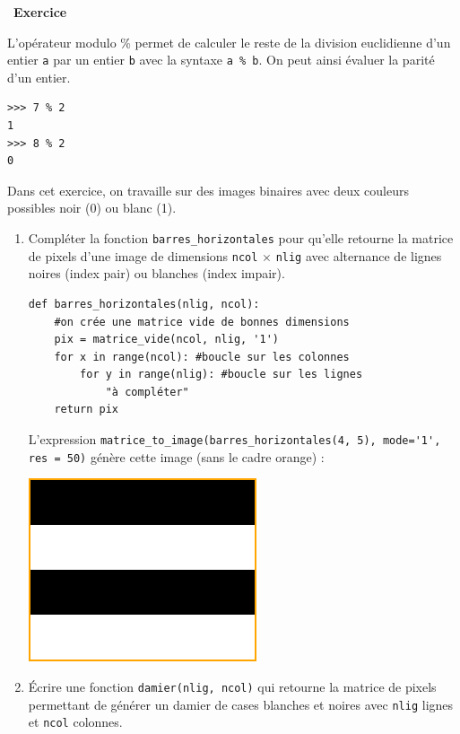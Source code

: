 \documentclass[a4paper, french, 12pt]{article}
\newcounter{exo}
\newenvironment{exercice}[1]
{\par \medskip   \addtocounter{exo}{1} \noindent  
\begin{bclogo}[arrondi =0.1,   noborder = true, logo=\bccrayon, marge=4]{~\textbf{Exercice} \textbf{\theexo} {\itshape #1} }  \par}
{
\end{bclogo}
 \par \bigskip }
\newcounter{def}
\begin{document}
\begin{exercice}{}

L'opérateur  modulo \% permet de calculer le reste de la division euclidienne d'un entier \texttt{a} par un entier \texttt{b} avec la syntaxe \texttt{a \% b}. On peut ainsi évaluer la parité d'un entier.

\begin{lstlisting}[style=compil]
>>> 7 % 2
1
>>> 8 % 2
0
\end{lstlisting}


Dans cet exercice, on travaille sur des images binaires avec deux couleurs possibles noir (0) ou blanc (1).

\begin{enumerate}
	\item Compléter la fonction \texttt{barres\_horizontales} pour qu'elle retourne la matrice de pixels d'une image  de dimensions  \texttt{ncol} $\times$ \texttt{nlig}  avec alternance   de lignes noires (index pair)  ou blanches (index impair).

\begin{lstlisting}[style=rond]
def barres_horizontales(nlig, ncol):
    #on crée une matrice vide de bonnes dimensions
    pix = matrice_vide(ncol, nlig, '1')
    for x in range(ncol): #boucle sur les colonnes
        for y in range(nlig): #boucle sur les lignes
            "à compléter"
    return pix 
\end{lstlisting}

L'expression \lstinline+matrice_to_image(barres_horizontales(4, 5), mode='1', res = 50)+ génère cette image (sans le cadre orange) :
\begin{center}
\includegraphics[scale=0.5]{images/bandes-horizontales-cadre.png}
\end{center}
\item Écrire une fonction \texttt{damier(nlig, ncol)} qui retourne la matrice de pixels permettant de générer un damier de cases blanches et noires avec \texttt{nlig} lignes et \texttt{ncol} colonnes.


\end{enumerate}
\end{exercice}
\end{document}
